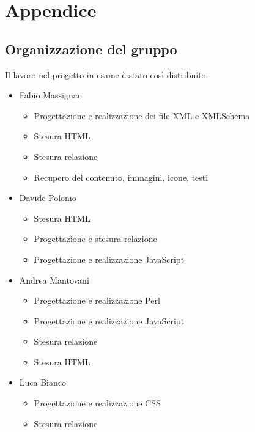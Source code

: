 \section{Appendice}

\subsection{Organizzazione del gruppo}

Il lavoro nel progetto in esame è stato così distribuito:

\begin{itemize}

    \item Fabio Massignan
    \begin{itemize}

        \item Progettazione e realizzazione dei file XML e XMLSchema
        \item Stesura HTML
        \item Stesura relazione
        \item Recupero del contenuto, immagini, icone, testi
    \end{itemize}

    \item Davide Polonio
    \begin{itemize}

        \item Stesura HTML
        \item Progettazione e stesura relazione
        \item Progettazione e realizzazione JavaScript

    \end{itemize}

    \item Andrea Mantovani
    \begin{itemize}

        \item Progettazione e realizzazione Perl
        \item Progettazione e realizzazione JavaScript
        \item Stesura relazione
        \item Stesura HTML

    \end{itemize}

    \item Luca Bianco
    \begin{itemize}

        \item Progettazione e realizzazione CSS
        \item Stesura relazione

    \end{itemize}


\end{itemize}
